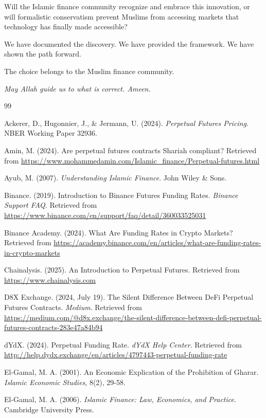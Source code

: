\documentclass[10pt,twocolumn]{article}
\begin{document}
Will the Islamic finance community recognize and embrace this innovation, or will formalistic conservatism prevent Muslims from accessing markets that technology has finally made accessible?

We have documented the discovery. We have provided the framework. We have shown the path forward.

The choice belongs to the Muslim finance community.

\textit{May Allah guide us to what is correct. Ameen.}


\begin{thebibliography}{99}

Ackerer, D., Hugonnier, J., \& Jermann, U. (2024).
\textit{Perpetual Futures Pricing}.
NBER Working Paper 32936.

Amin, M. (2024).
Are perpetual futures contracts Shariah compliant?
Retrieved from \url{https://www.mohammedamin.com/Islamic_finance/Perpetual-futures.html}

Ayub, M. (2007).
\textit{Understanding Islamic Finance}.
John Wiley \& Sons.

Binance. (2019).
Introduction to Binance Futures Funding Rates.
\textit{Binance Support FAQ}.
Retrieved from \url{https://www.binance.com/en/support/faq/detail/360033525031}

Binance Academy. (2024).
What Are Funding Rates in Crypto Markets?
Retrieved from \url{https://academy.binance.com/en/articles/what-are-funding-rates-in-crypto-markets}

Chainalysis. (2025).
An Introduction to Perpetual Futures.
Retrieved from \url{https://www.chainalysis.com}

D8X Exchange. (2024, July 19).
The Silent Difference Between DeFi Perpetual Futures Contracts.
\textit{Medium}.
Retrieved from \url{https://medium.com/@d8x.exchange/the-silent-difference-between-defi-perpetual-futures-contracts-283e47a84b94}

dYdX. (2024).
Perpetual Funding Rate.
\textit{dYdX Help Center}.
Retrieved from \url{http://help.dydx.exchange/en/articles/4797443-perpetual-funding-rate}

El-Gamal, M. A. (2001).
An Economic Explication of the Prohibition of Gharar.
\textit{Islamic Economic Studies}, 8(2), 29-58.

El-Gamal, M. A. (2006).
\textit{Islamic Finance: Law, Economics, and Practice}.
Cambridge University Press.


\end{thebibliography}
\end{document}
